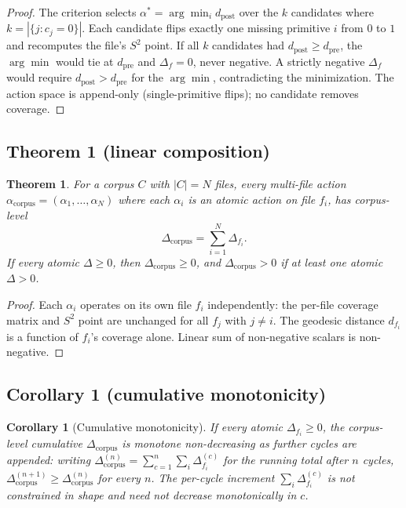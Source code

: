 \documentclass[11pt,a4paper]{article}
\theoremstyle{plain}
\newtheorem{theorem}{Theorem}
\newtheorem{corollary}{Corollary}
\theoremstyle{remark}
\theoremstyle{plain}
\begin{document}
\begin{proof}
The criterion selects $\alpha^* = \arg\min_i d_{\mathrm{post}}$ over the $k$ candidates where $k = |\{j : c_j = 0\}|$. Each candidate flips exactly one missing primitive $i$ from $0$ to $1$ and recomputes the file's $S^2$ point. If all $k$ candidates had $d_{\mathrm{post}} \geq d_{\mathrm{pre}}$, the $\arg\min$ would tie at $d_{\mathrm{pre}}$ and $\Delta_f = 0$, never negative. A strictly negative $\Delta_f$ would require $d_{\mathrm{post}} > d_{\mathrm{pre}}$ for the $\arg\min$, contradicting the minimization. The action space is append-only (single-primitive flips); no candidate removes coverage.
\end{proof}

\subsection{Theorem 1 (linear composition)}

\begin{theorem}
For a corpus $C$ with $|C| = N$ files, every multi-file action $\alpha_{\mathrm{corpus}} = (\alpha_1, \ldots, \alpha_N)$ where each $\alpha_i$ is an atomic action on file $f_i$, has corpus-level
\begin{equation}
\Delta_{\mathrm{corpus}} = \sum_{i=1}^{N} \Delta_{f_i}.
\label{eq:composition}
\end{equation}
If every atomic $\Delta \geq 0$, then $\Delta_{\mathrm{corpus}} \geq 0$, and $\Delta_{\mathrm{corpus}} > 0$ if at least one atomic $\Delta > 0$.
\end{theorem}

\begin{proof}
Each $\alpha_i$ operates on its own file $f_i$ independently: the per-file coverage matrix and $S^2$ point are unchanged for all $f_j$ with $j \neq i$. The geodesic distance $d_{f_i}$ is a function of $f_i$'s coverage alone. Linear sum of non-negative scalars is non-negative.
\end{proof}

\subsection{Corollary 1 (cumulative monotonicity)}

\begin{corollary}[Cumulative monotonicity]
If every atomic $\Delta_{f_i} \geq 0$, the corpus-level cumulative $\Delta_{\mathrm{corpus}}$ is monotone non-decreasing as further cycles are appended: writing $\Delta^{(n)}_{\mathrm{corpus}} = \sum_{c=1}^{n} \sum_{i} \Delta^{(c)}_{f_i}$ for the running total after $n$ cycles, $\Delta^{(n+1)}_{\mathrm{corpus}} \geq \Delta^{(n)}_{\mathrm{corpus}}$ for every $n$. The per-cycle increment $\sum_i \Delta^{(c)}_{f_i}$ is not constrained in shape and need not decrease monotonically in $c$.
\end{corollary}
\end{document}
